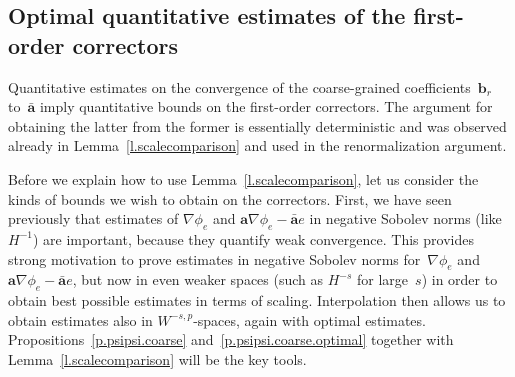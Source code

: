 \documentclass[11pt]{article} %
\numberwithin{equation}{section}
\theoremstyle{definition}
\renewcommand{\b}{\ensuremath{\mathbf{b}}}
\renewcommand{\a}{\mathbf{a}}
\newcommand{\ahom}{\bar{\a}}
\begin{document}
\subsection{Optimal quantitative estimates of the first-order correctors}
\label{ss.correctors.optimal}

Quantitative estimates on the convergence of the coarse-grained coefficients~$\b_r$ to~$\ahom$ imply quantitative bounds on the first-order correctors. The argument for obtaining the latter from the former is essentially deterministic and was observed already in Lemma~\ref{l.scalecomparison} and used in the renormalization argument. 

\smallskip

Before we explain how to use Lemma~\ref{l.scalecomparison}, let us consider the kinds of bounds we wish to obtain on the correctors. First, we have seen previously that estimates of $\nabla \phi_e$ and $\a\nabla \phi_e - \ahom e$ in negative Sobolev norms (like $H^{-1}$) are important, because they quantify weak convergence. This provides strong motivation to prove estimates in negative Sobolev norms for~$\nabla \phi_e$ and~$\a\nabla \phi_e - \ahom e$, but now in even weaker spaces (such as $H^{-s}$ for large~$s$) in order to obtain best possible estimates in terms of scaling. Interpolation then allows us to obtain estimates also in $W^{-s,p}$-spaces, again with optimal estimates. Propositions~\ref{p.psipsi.coarse} and~\ref{p.psipsi.coarse.optimal} together with Lemma~\ref{l.scalecomparison} will be the key tools. 


\smallskip
\end{document}
